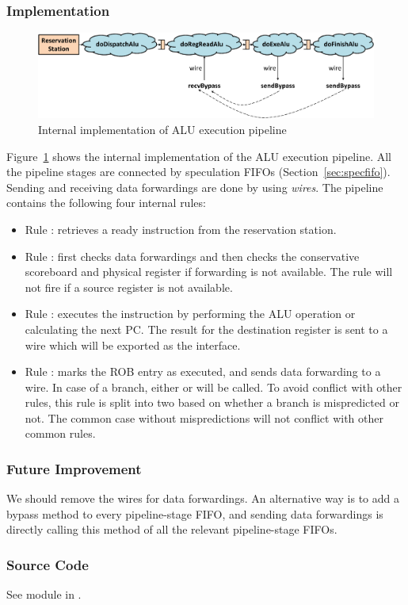 \subsubsection{Implementation}

\begin{figure}
    \centering
    \includegraphics[width=\columnwidth]{fig/alu_exe_crop.pdf}
    \caption{Internal implementation of ALU execution pipeline}\label{fig:alu-exe-pipe-impl}
\end{figure}

Figure~\ref{fig:alu-exe-pipe-impl} shows the internal implementation of the ALU execution pipeline.
All the pipeline stages are connected by speculation FIFOs (Section~\ref{sec:specfifo}).
Sending and receiving data forwardings are done by using \emph{wires}.
The pipeline contains the following four internal rules:
\begin{itemize}
    \item Rule : retrieves a ready instruction from the reservation station.
    \item Rule : first checks data forwardings and then checks the conservative scoreboard and physical register if forwarding is not available.
    The rule will not fire if a source register is not available.
    \item Rule : executes the instruction by performing the ALU operation or calculating the next PC.
    The result for the destination register is sent to a wire which will be exported as the  interface.
    \item Rule : marks the ROB entry as executed, and sends data forwarding to a wire.
    In case of a branch, either  or  will be called.
    To avoid conflict with other rules, this rule is split into two based on whether a branch is mispredicted or not.
    The common case without mispredictions will not conflict with other common rules.
\end{itemize}

\subsubsection{Future Improvement}
We should remove the wires for data forwardings.
An alternative way is to add a bypass method to every pipeline-stage FIFO, and sending data forwardings is directly calling this method of all the relevant pipeline-stage FIFOs.

\subsubsection{Source Code}
See module  in .
